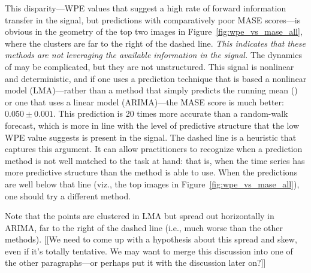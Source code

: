 This disparity---WPE values that suggest a high rate of forward
information transfer in the signal, but predictions with comparatively
poor MASE scores---is obvious in the geometry of the top two images in
Figure~\ref{fig:wpe_vs_mase_all}, where the \col clusters are far to
the right of the dashed line.  {\sl This indicates that these methods
  are not leveraging the available information in the signal.}  The
dynamics of \col may be complicated, but they are not unstructured.
This signal is nonlinear and deterministic, and if one uses a
prediction technique that is based a nonlinear model (LMA)---rather
than a method that simply predicts the running mean (\naive) or one
that uses a linear model (ARIMA)---the MASE score is much better:
$0.050 \pm 0.001$.  This prediction is 20 times more accurate than a
random-walk forecast, which is more in line with the level of
predictive structure that the low WPE value suggests is present in the
signal.  The dashed line is a heuristic that captures this argument.
It can allow practitioners to recognize when a prediction method is
not well matched to the task at hand: that is, when the time series
has more predictive structure than the method is able to use.  When
the predictions are well below that line (viz., the top images in
Figure~\ref{fig:wpe_vs_mase_all}), one should try a different method.

Note that the \col points are clustered in LMA but spread out
horizontally in ARIMA, far to the right of the dashed line (i.e., much
worse than the other methods).  [[We need to come up with a hypothesis
    about this spread and skew, even if it's totally tentative.  We
    may want to merge this discussion into one of the other \col
    paragraphs---or perhaps put it with the \svdone discussion later
    on?]]

